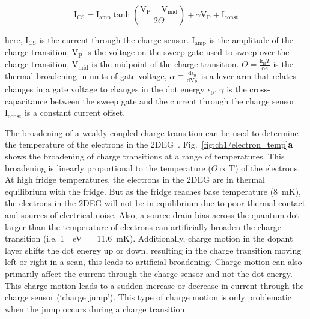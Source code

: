\begin{equation}\label{eq:cs_lineshape}
 \mathrm{I_{CS}} = 
 \mathrm{I_{amp}}
 \tanh
 \left( 
 \frac{\mathrm{V_P - V_{mid}}}{2\Theta}
 \right) + 
 \gamma \mathrm{V_P}
 + \mathrm{I_{const}}
\end{equation}

\noindent here, $\mathrm{I_{CS}}$ is the current through the charge sensor. $\mathrm{I_{amp}}$ is the amplitude of the charge transition, $\mathrm{V_{P}}$ is the voltage on the sweep gate used to sweep over the charge transition, $\mathrm{V_{mid}}$ is the midpoint of the charge transition. $\Theta=\frac{\mathrm{k_B}T}{\mathrm{\alpha e}}$ is the thermal broadening in units of gate voltage, $\alpha \equiv \frac{\mathrm{d\epsilon_0}}{\mathrm{dV_P}}$ is a lever arm that relates changes in a gate voltage to changes in the dot energy $\epsilon_0$. $\gamma$ is the cross-capacitance between the sweep gate and the current through the charge sensor. $\mathrm{I_{const}}$ is a constant current offset.



The broadening of a weakly coupled charge transition can be used to determine the temperature of the electrons in the 2DEG~\cite{cs_measure_temp}. Fig.~\ref{fig:ch1/electron_temp}\textbf{a} shows the broadening of charge transitions at a range of temperatures. This broadening is linearly proportional to the temperature ($\Theta\propto\mathrm{T}$) of the electrons. At high fridge temperatures, the electrons in the 2DEG are in thermal equilibrium with the fridge. But as the fridge reaches base temperature (\qty{8}{mK}), the electrons in the 2DEG will not be in equilibrium due to poor thermal contact and sources of electrical noise. Also, a source-drain bias across the quantum dot larger than the temperature of electrons can artificially broaden the charge transition (i.e. \qty{1}{\mu eV}~=~\qty{11.6}{mK}). Additionally, charge motion in the dopant layer shifts the dot energy up or down, resulting in the charge transition moving left or right in a scan, this leads to artificial broadening. Charge motion can also primarily affect the current through the charge sensor and not the dot energy. This charge motion leads to a sudden increase or decrease in current through the charge sensor (`charge jump'). This type of charge motion is only problematic when the jump occurs during a charge transition.


